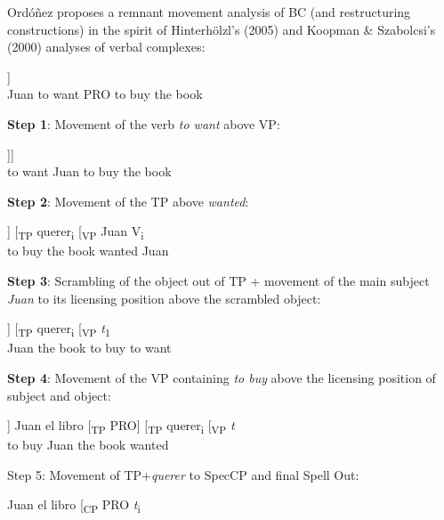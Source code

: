 \documentclass[output=paper]{langsci/langscibook}
\begin{document}
Ordóñez proposes a remnant movement analysis of BC (and restructuring constructions) in the spirit of Hinterhölzl’s (2005) and Koopman \& Szabolcsi’s (2000) analyses of verbal complexes:

\ea%
    \label{ex:alexiadou:18}
    \begin{xlista}
    \setcounter{xnumii}{0}
    \ex \gll\relax [\textsubscript{VP} Juan [querer [\textsubscript{CP} PRO [\textsubscript{VP} comprar el libro]]\\
                     Juan to want PRO to buy the book\\
    \end{xlista}
    \textbf{Step 1}: Movement of the verb \textit{to want} above VP:
    \begin{xlista}
    \setcounter{xnumii}{1}
    \ex \gll\relax [\textsubscript{TP} querer\textsubscript{} Juan V\textsubscript{i} [\textsubscript{TP} PRO[\textsubscript{VP} comprar el libro]]]\\
      to want Juan to buy the book\\
    \end{xlista}
    \textbf{Step 2}: Movement of the TP above \textit{wanted}:
    \begin{xlista}
    \setcounter{xnumii}{2}
    \ex \gll\relax [\textsubscript{TP} PRO [\textsubscript{VP} comprar el libro]] [\textsubscript{TP} querer\textsubscript{i} [\textsubscript{VP} Juan V\textsubscript{i}\\
       to buy the book wanted Juan\\
    \end{xlista}
    \textbf{Step 3}: Scrambling of the object out of TP + movement of the main subject \textit{Juan} to its licensing position above the scrambled object:
    \begin{xlista}
    \setcounter{xnumii}{3}
    \ex \gll\relax  [Juan\textsubscript{1} el libro\textsubscript{2} [\textsubscript{TP} PRO [\textsubscript{VP} comprar \textit{t}\textsubscript{2}]] [\textsubscript{TP} querer\textsubscript{i} [\textsubscript{VP} \textit{t}\textsubscript{1}\\
                    Juan the book to buy to want\\
    \end{xlista}
    \textbf{Step 4}: Movement of the VP containing \textit{to buy} above the licensing position of subject and object:
    \begin{xlista}
    \setcounter{xnumii}{4}
    \ex \gll\relax [[\textsubscript{VP} comprar \textit{t}]] Juan el libro [\textsubscript{TP} PRO] [\textsubscript{TP} querer\textsubscript{i} [\textsubscript{VP} \textit{t}\\
                   to buy Juan the book wanted\\
    \end{xlista}
    Step 5: Movement of TP+\textit{querer} to SpecCP and final Spell Out:
    \begin{xlista}
    \setcounter{xnumii}{5}
    \ex\relax [\textsubscript{CP} [\textsubscript{TP} querer\textsubscript{i} [\textsubscript{VP} \textit{t} [\textsubscript{VP} comprar \textit{t}\textsubscript{i]}] Juan el libro [\textsubscript{CP} PRO \textit{t}\textsubscript{i}
    \end{xlista}
    \z
\end{document}
